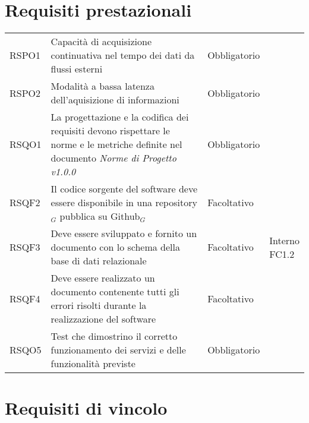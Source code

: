 {\section{Requisiti prestazionali}\label{RequisitiPrestazionali}
\def\tabularxcolumn#1{m{#1}}
{
	
	\begin{center}
		\renewcommand{\arraystretch}{1.4}
		\begin{longtable}{|p{4cm}|p{4cm}|p{4cm}|p{3cm}|}
		\hline
		\rowcolor{airforceblue}
		\makecell[c]{\textbf{Codice RS}} & \makecell[c]{\textbf{Descrizione}} & \makecell[c]{\textbf{Tipo di requisito}} & \makecell[c]{\textbf{Fonte}} \\
		\hline
		RSPO1 & Capacità di acquisizione continuativa nel tempo dei dati da flussi esterni & Obbligatorio & \makecell[c]{Capitolato}  \\
		\hline
		RSPO2 & Modalità a bassa latenza dell'aquisizione di informazioni & Obbligatorio & \makecell[c]{Capitolato} \\
		\hline
		RSQO1  & La progettazione e la codifica dei requisiti devono rispettare le norme e le metriche definite nel documento \textit{Norme di Progetto v1.0.0}& Obbligatorio & \makecell[c]{Interno} \\
		\hline
		RSQF2  & Il codice sorgente del software deve essere disponibile in una repository$_G$ pubblica su Github$_G$  & Facoltativo & \makecell[c]{Interno} \\
		\hline
		RSQF3  & Deve essere sviluppato e fornito un documento con lo schema della base di dati relazionale  & Facoltativo & \makecell[c]{Interno \\ FC1.2} \\
		\hline
		RSQF4  & Deve essere realizzato un documento contenente tutti gli errori risolti durante la realizzazione del software & Facoltativo & \makecell[c]{Interno} \\
		\hline
		RSQO5  & Test che dimostrino il corretto funzionamento dei servizi e delle funzionalità previste  & Obbligatorio & \makecell[c]{Capitolato} \\
		\hline
		\end{longtable}
\end{center}


\section{Requisiti di vincolo}\label{RequisitiVincolo}
\def\tabularxcolumn#1{m{#1}}
{
	
}}}
